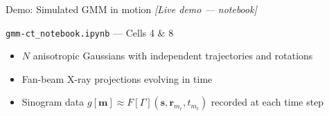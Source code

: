 \documentclass{beamer}
\begin{document}
    \begin{frame}{Demo: Simulated GMM in motion}
        \centering
        {\Large \textit{[Live demo --- notebook]}}

        \vspace{1em}
        \texttt{gmm-ct\_notebook.ipynb} --- Cells 4 \& 8

        \vspace{1em}
        \begin{itemize}
            \item $N$ anisotropic Gaussians with independent trajectories and rotations
            \item Fan-beam X-ray projections evolving in time
            \item Sinogram data $g[\mathbf{m}] \approx F[\Gamma](\mathbf{s}, \mathbf{r}_{m_r}, t_{m_t})$ recorded at each time step
        \end{itemize}

    \end{frame}
\end{document}
